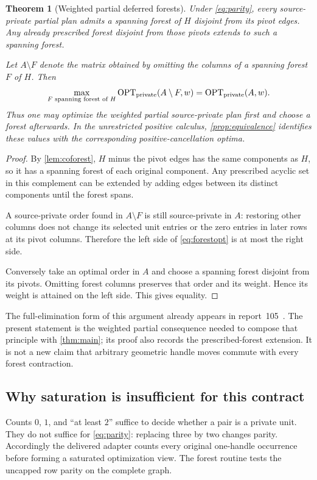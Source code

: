 \documentclass[11pt,letterpaper]{article}
\newtheorem{theorem}{Theorem}[section]
\theoremstyle{definition}
\theoremstyle{remark}
\newcommand{\OPT}{\operatorname{OPT}}
\begin{document}
\begin{theorem}[Weighted partial deferred forests]
\label{thm:forest}
Under \cref{eq:parity}, every source-private partial plan admits a spanning forest of $H$ disjoint from its pivot edges. Any already prescribed forest disjoint from those pivots extends to such a spanning forest.

Let $A\setminus F$ denote the matrix obtained by omitting the columns of a spanning forest $F$ of $H$. Then
\begin{equation}
 \max_{F\text{ spanning forest of }H}\OPT_{\rm private}(A\setminus F,w)
       =\OPT_{\rm private}(A,w).
 \label{eq:forestopt}
\end{equation}
Thus one may optimize the weighted partial source-private plan first and choose a forest afterwards. In the unrestricted positive calculus, \cref{prop:equivalence} identifies these values with the corresponding positive-cancellation optima.
\end{theorem}
\begin{proof}
By \cref{lem:coforest}, $H$ minus the pivot edges has the same components as $H$, so it has a spanning forest of each original component. Any prescribed acyclic set in this complement can be extended by adding edges between its distinct components until the forest spans.

A source-private order found in $A\setminus F$ is still source-private in $A$: restoring other columns does not change its selected unit entries or the zero entries in later rows at its pivot columns. Therefore the left side of \cref{eq:forestopt} is at most the right side.

Conversely take an optimal order in $A$ and choose a spanning forest disjoint from its pivots. Omitting forest columns preserves that order and its weight. Hence its weight is attained on the left side. This gives equality.
\end{proof}

The full-elimination form of this argument already appears in report~105~\cite{prove105}. The present statement is the weighted partial consequence needed to compose that principle with \cref{thm:main}; its proof also records the prescribed-forest extension. It is not a new claim that arbitrary geometric handle moves commute with every forest contraction.

\subsection{Why saturation is insufficient for this contract}
Counts $0$, $1$, and ``at least $2$'' suffice to decide whether a pair is a private unit. They do not suffice for \cref{eq:parity}: replacing three by two changes parity. Accordingly the delivered adapter counts every original one-handle occurrence before forming a saturated optimization view. The forest routine tests the uncapped row parity on the complete graph.
\end{document}
